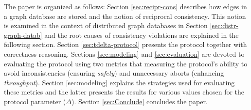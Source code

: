 The paper is organized as follows: Section \ref{sec:recipr-cons} describes how edges in a graph database are stored and the notion of reciprocal consistency.
This notion is examined in the context of distributed graph databases in Section \ref{sec:distr-graph-datab} and the root causes of consistency violations are explained in the following section.
Section \ref{sec:tdelta-protocol} presents the \tDelta protocol together with correctness reasoning.
Sections  \ref{sec:modeling} and \ref{sec:evaluation} are devoted to evaluating the protocol using two metrics that measuring the protocol's ability to avoid inconsistencies (ensuring \emph{safety}) and unnecessary aborts (enhancing \emph{throughput}).
Section  \ref{sec:modeling} explains the strategies used for evaluating these metrics and the latter presents the results for various values chosen for the protocol parameter ($\Delta$). Section \ref{sec:Conclude} concludes the paper.
